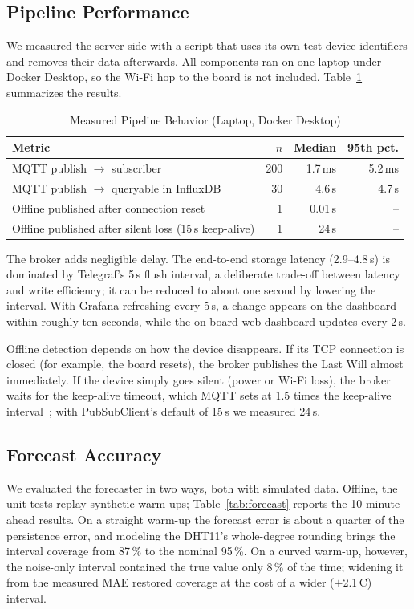 \documentclass[conference]{IEEEtran}
\begin{document}
\subsection{Pipeline Performance}
We measured the server side with a script that uses its own test device identifiers
and removes their data afterwards. All components ran on one laptop under Docker
Desktop, so the Wi-Fi hop to the board is not included. Table~\ref{tab:perf}
summarizes the results.

\begin{table}[t]
  \caption{Measured Pipeline Behavior (Laptop, Docker Desktop)}
  \label{tab:perf}
  \centering
  \begin{tabular}{@{}>{\raggedright\arraybackslash}p{}rrr@{}}
    \toprule
    Metric & $n$ & Median & 95th pct. \\
    \midrule
    MQTT publish $\rightarrow$ subscriber & 200 & 1.7\,ms & 5.2\,ms \\
    MQTT publish $\rightarrow$ queryable in InfluxDB & 30 & 4.6\,s & 4.7\,s \\
    Offline published after connection reset & 1 & 0.01\,s & -- \\
    Offline published after silent loss (15\,s keep-alive) & 1 & 24\,s & -- \\
    \bottomrule
  \end{tabular}
\end{table}

The broker adds negligible delay. The end-to-end storage latency (2.9--4.8\,s) is
dominated by Telegraf's 5\,s flush interval, a deliberate trade-off between latency and
write efficiency; it can be reduced to about one second by lowering the interval. With
Grafana refreshing every 5\,s, a change appears on the dashboard within roughly ten
seconds, while the on-board web dashboard updates every 2\,s.

Offline detection depends on how the device disappears. If its TCP connection is closed
(for example, the board resets), the broker publishes the Last Will almost immediately.
If the device simply goes silent (power or Wi-Fi loss), the broker waits for the
keep-alive timeout, which MQTT sets at 1.5 times the keep-alive interval~\cite{mqtt311};
with PubSubClient's default of 15\,s we measured 24\,s.

\subsection{Forecast Accuracy}
We evaluated the forecaster in two ways, both with simulated data. Offline, the unit tests
replay synthetic warm-ups; Table~\ref{tab:forecast} reports the 10-minute-ahead results.
On a straight warm-up the forecast error is about a quarter of the persistence error, and
modeling the DHT11's whole-degree rounding brings the interval coverage from 87\,\% to the
nominal 95\,\%. On a curved warm-up, however, the noise-only interval contained the true
value only 8\,\% of the time; widening it from the measured MAE restored coverage at the
cost of a wider ($\pm$2.1\,\textdegree C) interval.
\end{document}
